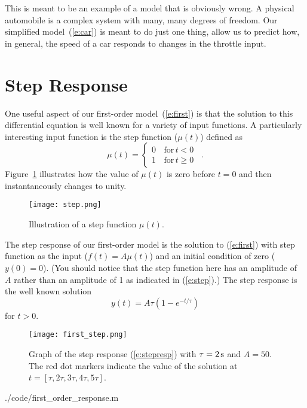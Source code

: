 This is meant to be an example of a model that is obviously wrong.  A physical automobile is a complex system with many, many degrees of freedom.  Our simplified model~(\ref{e:car}) is meant to do just one thing, allow us to predict how, in general, the speed of a car responds to changes in the throttle input.

\section{Step Response}
One useful aspect of our first-order model~(\ref{e:first}) is that the solution to this differential equation is well known for a variety of input functions.  A particularly interesting input function is the \gls{step function} ($\mu(t)$) defined as
\begin{equation}
\label{e:step}
\mu(t)= \left\{ 
\begin{array}{cl}
0 & \, \mathrm{for}\, t < 0 \,\,\,\\
1 & \, \mathrm{for}\, t \geq 0
\end{array} \right.
.
\end{equation}
Figure~\ref{f:step} illustrates how the value of $\mu(t)$ is zero before $t=0$ and then instantaneously changes to unity.
\begin{figure}[hbt!]
\centering
\texttt{[image: step.png]}
\caption{Illustration of a step function $\mu(t)$.}
\label{f:step}
\end{figure}

The \gls{step response} of our first-order model is the solution to (\ref{e:first}) with step function as the input ($f(t)=A\mu(t)$) and an initial condition of zero ($y(0)=0$).  (You should notice that the step function here has an amplitude of $A$ rather than an amplitude of 1 as indicated in (\ref{e:step}).)  The step response is the well known solution
\begin{equation}\label{e:stepresp}
y(t) = A\tau\left(1-e^{-t/\tau}\right)
\end{equation}
for $t>0$.

\begin{figure}[hbt]
\centering
\texttt{[image: first\_step.png]}
\caption{Graph of the step response (\ref{e:stepresp}) with $\tau=\unit[2]{s}$ and $A=50$.  The red dot markers indicate the value of the solution at $t=[\tau,2\tau,3\tau,4\tau,5\tau]$. }
\label{f:firststep}
\end{figure}



{./code/first_order_response.m}


